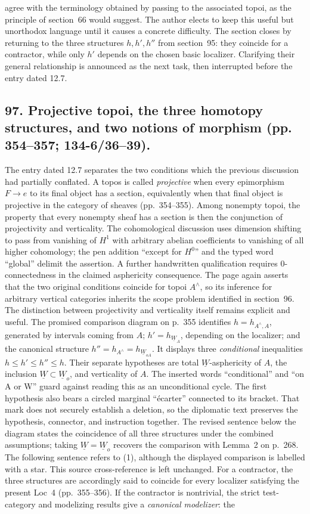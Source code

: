 \documentclass[10pt,oneside]{book}
\begin{document}
agree with the terminology obtained by passing to the associated topoi, as the principle of section~66 would suggest. The author elects to keep this useful but unorthodox language until it causes a concrete difficulty. The section closes by returning to the three structures $h,h',h''$ from section~95: they coincide for a contractor, while only $h'$ depends on the chosen basic localizer. Clarifying their general relationship is announced as the next task, then interrupted before the entry dated 12.7.

\subsection*{97. Projective topoi, the three homotopy structures, and two notions of morphism (pp. 354--357; 134-6/36--39).}
The entry dated 12.7 separates the two conditions which the previous discussion had partially conflated. A topos is called \emph{projective} when every epimorphism $F\to e$ to its final object has a section, equivalently when that final object is projective in the category of sheaves (pp.~354--355). Among nonempty topoi, the property that every nonempty sheaf has a section is then the conjunction of projectivity and verticality. The cohomological discussion uses dimension shifting to pass from vanishing of $H^1$ with arbitrary abelian coefficients to vanishing of all higher cohomology; the pen addition ``except for $H^0$'' and the typed word ``global'' delimit the assertion. A further handwritten qualification requires 0-connectedness in the claimed asphericity consequence. The page again asserts that the two original conditions coincide for topoi $A^{\wedge}$, so its inference for arbitrary vertical categories inherits the scope problem identified in section~96. The distinction between projectivity and verticality itself remains explicit and useful. The promised comparison diagram on p.~355 identifies $h=h_{A^{\wedge},A}$, generated by intervals coming from $A$; $h'=h_{\underline W_A}$, depending on the localizer; and the canonical structure $h''=h_{A^{\wedge}}=h_{\underline W_{oA}}$. It displays three \emph{conditional} inequalities $h\leq h'\leq h''\leq h$. Their separate hypotheses are total $\underline W$-asphericity of $A$, the inclusion $\underline W\subset\underline W_o$, and verticality of $A$. The inserted words ``conditional'' and ``on A or W'' guard against reading this as an unconditional cycle. The first hypothesis also bears a circled marginal ``\'ecarter'' connected to its bracket. That mark does not securely establish a deletion, so the diplomatic text preserves the hypothesis, connector, and instruction together. The revised sentence below the diagram states the coincidence of all three structures under the combined assumptions; taking $\underline W=\underline W_o$ recovers the comparison with Lemma~2 on p.~268. The following sentence refers to (1), although the displayed comparison is labelled with a star. This source cross-reference is left unchanged. For a contractor, the three structures are accordingly said to coincide for every localizer satisfying the present Loc~4 (pp.~355--356). If the contractor is nontrivial, the strict test-category and modelizing results give a \emph{canonical modelizer}: the 
\end{document}
